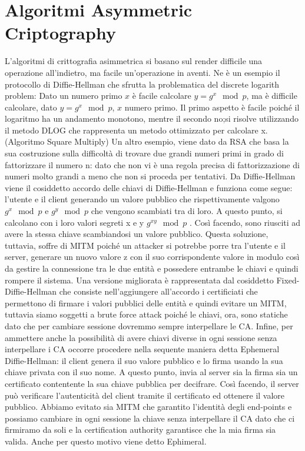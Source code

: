 \documentclass{article}
\begin{document}
\section{Algoritmi Asymmetric Criptography}
L'algoritmi di crittografia asimmetrica si basano sul render difficile una operazione all'indietro, ma facile un'operazione in aventi\@.
Ne è un esempio il protocollo di Diffie-Hellman che sfrutta la problematica del discrete logarith problem: Dato un numero primo \(x\) è facile calcolare \(y=g^x\mod{p}\), ma è difficile calcolare, dato \(y=g^x\mod{p}\), \(x\) numero primo\@. Il primo aspetto è facile poiché il logaritmo ha un andamento monotono, mentre il secondo no;\@quindi si risolve utilizzando il metodo DLOG che rappresenta un metodo ottimizzato per calcolare x\@. (Algoritmo Square Multiply)\newline
Un altro esempio, viene dato da RSA che basa la sua costruzione sulla difficoltà di trovare due grandi numeri primi in grado di fattorizzare il numero n: dato che non vi è una regola precisa di fattorizzazione di numeri molto grandi a meno che non si proceda per tentativi\@.\newline
Da Diffie-Hellman viene il cosiddetto accordo delle chiavi di Diffie-Hellman e funziona come segue: l'utente e il client generando un valore pubblico che rispettivamente valgono \(g^x\mod{p}\) e \(g^y\mod{p}\) che vengono scambiati tra di loro\@. A questo punto, si calcolano con i loro valori segreti x e y \(g^{xy}\mod{p}\) \@. Così facendo, sono riusciti ad avere la stessa chiave scambiandosi un valore pubblico\@.\newline
Questa soluzione, tuttavia, soffre di MITM poiché un attacker si potrebbe porre tra l'utente e il server, generare un nuovo valore z con il suo corrispondente valore in modulo così da gestire la connessione tra le due entità e possedere entrambe le chiavi e quindi rompere il sistema\@.
 Una versione migliorata è rappresentata dal cosiddetto Fixed-Diffie-Hellman che consiste nell'aggiungere all'accordo i certificiati che permettono di firmare i valori pubblici delle entità e quindi evitare un MITM, tuttavia siamo soggetti a brute force attack poiché le chiavi, ora, sono statiche dato che per cambiare sessione dovremmo sempre interpellare le CA\@.\newline
Infine, per ammettere anche la possibilità di avere chiavi diverse in ogni sessione senza interpellare i CA occorre procedere nella sequente maniera detta Ephemeral Diffie-Hellman: il client genera il suo valore pubblico e lo firma usando la sua chiave privata con il suo nome\@. A questo punto, invia al server sia la firma sia un certificato contentente la sua chiave pubblica per decifrare\@. Così facendo, il server può verificare l'autenticità del client tramite il certificato ed ottenere il valore pubblico\@. \newline
Abbiamo evitato sia MITM che garantito l'identità degli end-points e possiamo cambiare in ogni sessione la chiave senza interpellare il CA dato che ci firmiramo da soli e la certification authority garantisce che la mia firma sia valida\@. Anche per questo motivo viene detto Ephimeral\@.
\end{document}
